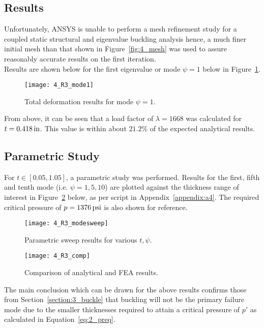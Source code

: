 \subsection{Results}

Unfortunately, ANSYS is unable to perform a mesh refinement study for a coupled static structural and eigenvalue buckling analysis hence, a much finer initial mesh than that shown in Figure~\ref{fig:4_mesh} was used to assure reasonably accurate results on the first iteration.\\

Results are shown below for the first eigenvalue or mode $\psi = 1$ below in Figure~\ref{fig:4_R3_mode1}.
\begin{figure}[H]
	\centering
	\texttt{[image: 4\_R3\_mode1]}
	\caption{Total deformation results for mode $\psi = 1$.}
	\label{fig:4_R3_mode1}
\end{figure}

From above, it can be seen that a load factor of $\lambda = 1668$ was calculated for $t= 0.418\,\mathrm{in}$. This value is within about $21.2\%$ of the expected analytical results.

\subsection{Parametric Study}

For $t\in [0.05, 1.05]$, a parametric study was performed. Results for the first, fifth and tenth mode (i.e. $\psi = 1, 5, 10$) are plotted against the thickness range of interest in Figure~\ref{fig:4_R3_modesweep} below, as per \cite{PYTHON} script in Appendix~\ref{appendix:a4}. The required critical pressure of $p =1376\,\mathrm{psi}$ is also shown for reference.

\begin{figure}[H]
	\centering
	\texttt{[image: 4\_R3\_modesweep]}
	\caption{Parametric sweep results for various $t, \psi$.}
	\label{fig:4_R3_modesweep}
\end{figure}

\begin{figure}[H]
	\centering
	\texttt{[image: 4\_R3\_comp]}
	\caption{Comparison of analytical and FEA results.}
	\label{fig:4_R3_comp}
\end{figure}


The main conclusion which can be drawn for the above results confirms those from Section~\ref{section:3_buckle} that buckling will not be the primary failure mode due to the smaller thicknesses required to attain a critical pressure of $p'$ as calculated in Equation~\ref{eq:2_preq}.

